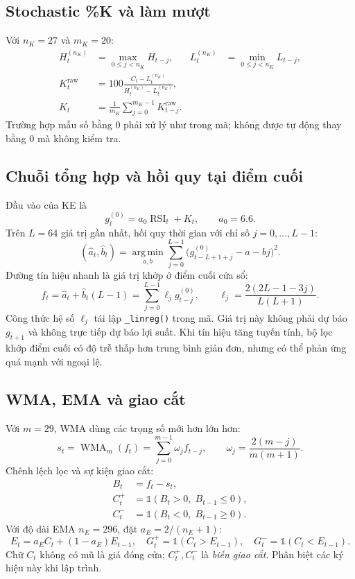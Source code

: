 \documentclass[12pt,a4paper,oneside]{article}
\newcommand{\Ind}{\mathbb{1}}
\newcommand{\WMA}{\operatorname{WMA}}
\newcommand{\RSI}{\operatorname{RSI}}
\newcommand{\argmin}{\operatorname*{arg\,min}}
\begin{document}
\subsection{Stochastic \%K và làm mượt}
Với $n_K=27$ và $m_K=20$:
\begin{align}
H_t^{(n_K)}&=\max_{0\leq j<n_K}H_{t-j},&L_t^{(n_K)}&=\min_{0\leq j<n_K}L_{t-j},\\
K_t^{\mathrm{raw}}&=100\frac{C_t-L_t^{(n_K)}}{H_t^{(n_K)}-L_t^{(n_K)}},\\
K_t&=\frac{1}{m_K}\sum_{j=0}^{m_K-1}K_{t-j}^{\mathrm{raw}}.
\end{align}
Trường hợp mẫu số bằng 0 phải xử lý như trong mã; không được tự động thay bằng 0 mà không kiểm tra.

\subsection{Chuỗi tổng hợp và hồi quy tại điểm cuối}
Đầu vào của KE là
\begin{equation}\label{eq:g0}
g_t^{(0)}=a_0\RSI_t+K_t,\qquad a_0=6.6.
\end{equation}
Trên $L=64$ giá trị gần nhất, hồi quy thời gian với chỉ số $j=0,\dots,L-1$:
\begin{equation}
(\widehat a_t,\widehat b_t)=\argmin_{a,b}\sum_{j=0}^{L-1}\big(g_{t-L+1+j}^{(0)}-a-bj\big)^2.
\end{equation}
Đường tín hiệu nhanh là giá trị khớp ở điểm cuối cửa sổ:
\begin{equation}\label{eq:linreg}
f_t=\widehat a_t+\widehat b_t(L-1)
=\sum_{j=0}^{L-1}\ell_j g_{t-j}^{(0)},\qquad
\ell_j=\frac{2(2L-1-3j)}{L(L+1)}.
\end{equation}
Công thức hệ số $\ell_j$ tái lập \texttt{\_linreg()} trong mã. Giá trị này không phải dự báo $g_{t+1}$ và không trực tiếp dự báo lợi suất. Khi tín hiệu tăng tuyến tính, bộ lọc khớp điểm cuối có độ trễ thấp hơn trung bình giản đơn, nhưng có thể phản ứng quá mạnh với ngoại lệ.

\subsection{WMA, EMA và giao cắt}
Với $m=29$, WMA dùng các trọng số mới hơn lớn hơn:
\begin{equation}\label{eq:wma}
s_t=\WMA_m(f_t)=\sum_{j=0}^{m-1}\omega_j f_{t-j},\qquad
\omega_j=\frac{2(m-j)}{m(m+1)}.
\end{equation}
Chênh lệch lọc và sự kiện giao cắt:
\begin{align}
B_t&=f_t-s_t,\\
C_t^+&=\Ind(B_t>0,\;B_{t-1}\leq0),\\
C_t^-&=\Ind(B_t<0,\;B_{t-1}\geq0).
\end{align}
Với độ dài EMA $n_E=296$, đặt $a_E=2/(n_E+1)$:
\begin{equation}
E_t=a_EC_t+(1-a_E)E_{t-1},\quad
G_t^+=\Ind(C_t>E_{t-1}),\quad G_t^-=\Ind(C_t<E_{t-1}).
\end{equation}
Chữ $C_t$ không có mũ là giá đóng cửa; $C_t^+,C_t^-$ là \emph{biến giao cắt}. Phân biệt các ký hiệu này khi lập trình.
\end{document}
